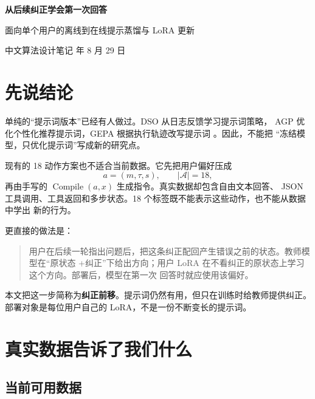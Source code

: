 \documentclass[11pt,UTF8,fontset=fandol]{ctexart}
\begin{document}
\begin{center}
  {\LARGE\bfseries 从后续纠正学会第一次回答\par}
  \vspace{5pt}
  {\large 面向单个用户的离线到在线提示蒸馏与 LoRA 更新\par}
  \vspace{4pt}
  {\small 中文算法设计笔记  年 8 月 29 日}
\end{center}

\section{先说结论}

单纯的``提示词版本''已经有人做过。DSO 从日志反馈学习提示词策略，
AGP 优化个性化推荐提示词，GEPA 根据执行轨迹改写提示词
\cite{kiyohara2025prompt,wang2025agp,agrawal2025gepa}。因此，不能把
``冻结模型，只优化提示词''写成新的研究点。

现有的 18 动作方案也不适合当前数据。它先把用户偏好压成
\[
  a=(m,\tau,s),\qquad |\mathcal A|=18,
\]
再由手写的 \(\operatorname{Compile}(a,x)\) 生成指令。真实数据却包含自由文本回答、
JSON 工具调用、工具返回和多步状态。18 个标签既不能表示这些动作，也不能从数据中学出
新的行为。

更直接的做法是：
\begin{quote}
用户在后续一轮指出问题后，把这条纠正配回产生错误之前的状态。教师模型在``原状态
+纠正''下给出方向；用户 LoRA 在不看纠正的原状态上学习这个方向。部署后，模型在第一次
回答时就应使用该偏好。
\end{quote}

本文把这一步简称为\textbf{纠正前移}。提示词仍然有用，但只在训练时给教师提供纠正。
部署对象是每位用户自己的 LoRA，不是一份不断变长的提示词。

\section{真实数据告诉了我们什么}

\subsection{当前可用数据}
\end{document}
